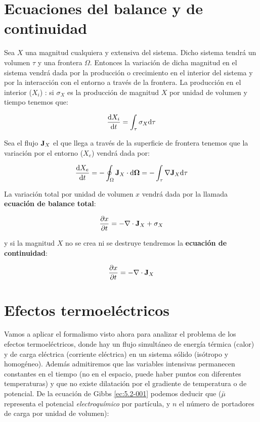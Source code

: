 \documentclass[12pt,a4paper,oneside]{book}
\begin{document}
\section{Ecuaciones del balance y de continuidad}

Sea $X$ una magnitud cualquiera y extensiva del sistema. Dicho sistema tendrá un volumen $\tau$ y una frontera $\Omega$. Entonces la variación de dicha magnitud en el sistema vendrá dada por la producción o crecimiento en el interior del sistema y por la interacción con el entorno a través de la frontera. La producción en el interior ($X_i$) : si $\sigma_X$ es la producción de magnitud $X$ por unidad de volumen y tiempo tenemos que:

\begin{equation}
\dfrac{\mathrm{d} X_i}{\mathrm{d} t} = \int_{\tau} \sigma_X \mathrm{d} \tau
\end{equation}
 
Sea el flujo $\textbf{J}_X$ el que llega a través de la superficie de frontera tenemos que la variación por el entorno ($X_e$) vendrá dada por:

\begin{equation}
\dfrac{\mathrm{d} X_e}{\mathrm{d} t} = - \oint_{\Omega} \textbf{J}_X  \cdot \mathrm{d} \mathbf{\Omega} =  - \int_{\tau} \nabla \textbf{J}_X \mathrm{d} \tau
\end{equation}

La variación total por unidad de volumen $x$ vendrá dada por la llamada \textbf{ecuación de balance total}:

\begin{equation}
\frac{\partial x}{\partial t} = - \nabla \cdot \textbf{J}_X + \sigma_X
\end{equation}

y si la magnitud $X$ no se crea ni se destruye tendremos la \textbf{ecuación de continuidad}:

\begin{equation}
\frac{\partial x}{\partial t} = - \nabla \cdot \textbf{J}_X
\end{equation}


\section{Efectos termoeléctricos}

Vamos a aplicar el formalismo visto ahora para analizar el problema de los efectos termoeléctricos, donde hay un flujo simultáneo de energía térmica (calor) y de carga eléctrica (corriente eléctrica) en un sistema sólido (isótropo y homogéneo). Además admitiremos que las variables intensivas permanecen constantes en el tiempo (no en el espacio, puede haber puntos con diferentes temperaturas) y que no existe dilatación por el gradiente de temperatura o de potencial. De la ecuación de Gibbs \ref{ec:5.2-001} podemos deducir que ($\bar{\mu}$ representa el potencial \textit{electroquímico} por partícula, y $n$ el número de portadores de carga por unidad de volumen):
\end{document}
